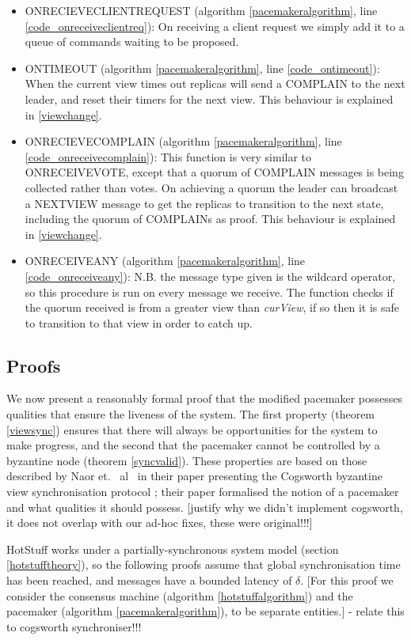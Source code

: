 \begin{itemize}
	\item ON{\large R}ECIEVE{\large C}LIENT{\large R}EQUEST (algorithm \ref{pacemakeralgorithm}, line \ref{code_onreceiveclientreq}): On receiving a client request we simply add it to a queue of commands waiting to be proposed.
	\item ON{\large T}IMEOUT (algorithm \ref{pacemakeralgorithm}, line \ref{code_ontimeout}): When the current view times out replicas will send a COMPLAIN to the next leader, and reset their timers for the next view. This behaviour is explained in \ref{viewchange}.
	\item ON{\large R}ECIEVE{\large C}OMPLAIN (algorithm \ref{pacemakeralgorithm}, line \ref{code_onreceivecomplain}): This function is very similar to ON{\large R}ECEIVE{\large V}OTE, except that a quorum of COMPLAIN messages is being collected rather than votes. On achieving a quorum the leader can broadcast a NEXT{\large V}IEW message to get the replicas to transition to the next state, including the quorum of COMPLAINs as proof. This behaviour is explained in \ref{viewchange}.
	\item ON{\large R}ECEIVE{\large A}NY (algorithm \ref{pacemakeralgorithm}, line \ref{code_onreceiveany}): N.B. the message type given is the wildcard operator, so this procedure is run on every message we receive. The function checks if the quorum received is from a greater view than \textit{curView}, if so then it is safe to transition to that view in order to catch up.
\end{itemize}

\subsection{Proofs}

We now present a reasonably formal proof that the modified pacemaker possesses qualities that ensure the liveness of the system. The first property (theorem \ref{viewsync}) ensures that there will always be opportunities for the system to make progress, and the second that the pacemaker cannot be controlled by a byzantine node (theorem \ref{syncvalid}). These properties are based on those described by Naor et. ~al~ in their paper presenting the Cogsworth byzantine view synchronisation protocol \cite{naor_cogsworth_2020}; their paper formalised the notion of a pacemaker and what qualities it should possess. [justify why we didn't implement cogsworth, it does not overlap with our ad-hoc fixes, these were original!!!]

HotStuff works under a partially-synchronous system model (section \ref{hotstufftheory}), so the following proofs assume that global synchronisation time has been reached, and messages have a bounded latency of $\delta$.
[For this proof we consider the consensus machine (algorithm \ref{hotstuffalgorithm}) and the pacemaker (algorithm \ref{pacemakeralgorithm}), to be separate entities.] - relate this to cogsworth synchroniser!!!

